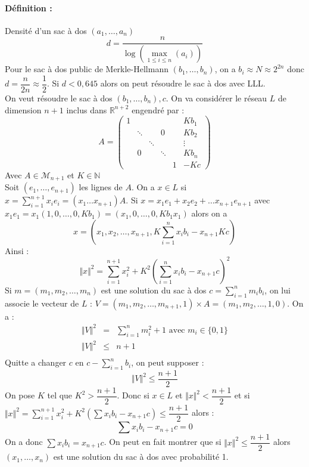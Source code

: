 \documentclass[12pt,a4paper]{report}
\begin{document}
\paragraph{Définition :} Densité d'un sac à dos $(a_1,\ldots,a_n)$\\
$$ d = \frac{n}{\log (\max_{1\leqslant i \leqslant n} (a_i))} $$
Pour le sac à dos public de Merkle-Hellmann $(b_1,\ldots,b_n)$, on a $b_i \approx N \approx 2^{2n}$ donc $d= \dfrac{n}{2n} \approx \dfrac{1}{2}$. Si $d < 0,645$ alors on peut résoudre le sac à dos avec LLL.\\

On veut résoudre le sac à dos $(b_1,\ldots,b_n),c$. On va considérer le réseau $L$ de dimension $ n+1$ inclus dans $\mathbb{R}^{n+2}$ engendré par :
$$ A = \left( \begin{array}{cccccc}
1 & & & & & Kb_1 \\
  & \ddots &  &0 & & Kb_2 \\
  & & \ddots & & & \vdots \\
  & 0 & & \ddots & & Kb_n \\
  & & & & 1 & -Kc \end{array} \right) $$
Avec $A \in \mathcal{M}_{n+1}$ et $K \in \mathbb{N}$\\
Soit $(e_1,\ldots,e_{n+1})$ les lignes de $A$. On a $x \in L$ si $x = \displaystyle \sum_{i=1}^{n+1} x_i e_i = (x_1\ldots x_{n+1}) A$.
Si $x = x_1 e_1 + x_2 e_2 + \ldots x_{n+1}e_{n+1}$ avec 
$x_1 e_1 = x_1 (1, 0, \ldots, 0, Kb_1) = (x_1, 0, \ldots,0, Kb_1x_1)$ alors on a  
$$ x=(x_1,x_2,\ldots, x_{n+1}, K \sum_{i=1}^n x_i b_i - x_{n+1}Kc) $$
Ainsi :
$$ \Vert x \Vert ^2 = \sum_{i=1}^{n+1} x_i^2 + K^2 \left(\sum_{i=1}^n x_i b_i -x_{n+1}c\right)^2$$
Si $m = (m_1,m_2,\ldots,m_n)$ est une solution du sac à dos $c = \displaystyle \sum_{i=1}^n m_i b_i$, on lui associe le vecteur de $L$ : $V = (m_1,m_2,\ldots,m_{n+1},1)\times A = (m_1,m_2,\ldots,1,0)$. On a :
\begin{eqnarray*}
\Vert V \Vert ^2 & = & \sum_{i=1}^n m_i^2 + 1 \mbox{ avec } m_i \in \{0,1\} \\
\Vert V \Vert ^2 & \leqslant & n+1 \\
\end{eqnarray*}
Quitte a changer $c$ en $c -\displaystyle  \sum_{i=1}^n b_i $, on peut supposer :
$$ \Vert V \Vert ^2 \leqslant \frac{n+1}{2} $$
On pose $K$ tel que $ K^2 >  \dfrac{n+1}{2}$. Donc si $x \in L$  et $ \Vert x \Vert ^2 < \dfrac{n+1}{2} $ et si $ \Vert x \Vert ^2 = \displaystyle \sum_{i=1}^{n+1} x_i ^2 + K^2 \left(\sum x_i b_i - x_{n+1}c\right) \leqslant \dfrac{n+1}{2}$ alors :
$$ \sum x_i b_i - x_{n+1} c = 0 $$
On a donc $\sum x_i b_i = x_{n+1}c $. On peut en fait montrer que si $\Vert x \Vert ^2 \leqslant \dfrac{n+1}{2}$ alors $(x_1,\ldots,x_n)$ est une solution du sac à dos avec probabilité 1.\\
\end{document}
